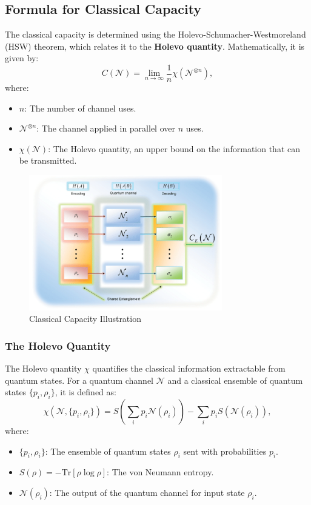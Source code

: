 \subsection{Formula for Classical Capacity}
The classical capacity is determined using the Holevo-Schumacher-Westmoreland (HSW) theorem, which relates it to the \textbf{Holevo quantity}. Mathematically, it is given by:
\[
C(\mathcal{N}) = \lim_{n \to \infty} \frac{1}{n} \chi\left(\mathcal{N}^{\otimes n}\right),
\]
where:
\begin{itemize}
    \item \(n\): The number of channel uses.
    \item \(\mathcal{N}^{\otimes n}\): The channel applied in parallel over \(n\) uses.
    \item \(\chi(\mathcal{N})\): The Holevo quantity, an upper bound on the information that can be transmitted.
\end{itemize}

\begin{figure}[H]
    \centering
    \includegraphics[width=0.75\textwidth]{figures/classical_cap.png}
    \caption{Classical Capacity Illustration \cite{6773024}}
\end{figure}

\subsubsection{The Holevo Quantity}
The Holevo quantity \(\chi\) quantifies the classical information extractable from quantum states. For a quantum channel \(\mathcal{N}\) and a classical ensemble of quantum states \(\{p_i, \rho_i\}\), it is defined as:
\[
\chi(\mathcal{N}, \{p_i, \rho_i\}) = S\left( \sum_i p_i \mathcal{N}(\rho_i) \right) - \sum_i p_i S\left( \mathcal{N}(\rho_i) \right),
\]
where:
\begin{itemize}
    \item \(\{p_i, \rho_i\}\): The ensemble of quantum states \(\rho_i\) sent with probabilities \(p_i\).
    \item \(S(\rho) = -\text{Tr}[\rho \log \rho]\): The von Neumann entropy.
    \item \(\mathcal{N}(\rho_i)\): The output of the quantum channel for input state \(\rho_i\).
\end{itemize}

